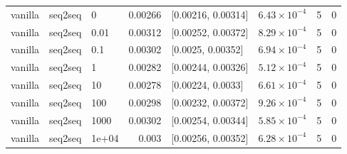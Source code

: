 \documentclass[10pt]{article}
\begin{document}
{\begin{longtable}{lllrlrrr}
vanilla & seq2seq & 0 & 0.00266 & [0.00216, 0.00314] & $6.43\times10^{-4}$ & 5 & 0\\
vanilla & seq2seq & 0.01 & 0.00312 & [0.00252, 0.00372] & $8.29\times10^{-4}$ & 5 & 0\\
vanilla & seq2seq & 0.1 & 0.00302 & [0.0025, 0.00352] & $6.94\times10^{-4}$ & 5 & 0\\
vanilla & seq2seq & 1 & 0.00282 & [0.00244, 0.00326] & $5.12\times10^{-4}$ & 5 & 0\\
vanilla & seq2seq & 10 & 0.00278 & [0.00224, 0.0033] & $6.61\times10^{-4}$ & 5 & 0\\
vanilla & seq2seq & 100 & 0.00298 & [0.00232, 0.00372] & $9.26\times10^{-4}$ & 5 & 0\\
vanilla & seq2seq & 1000 & 0.00302 & [0.00254, 0.00344] & $5.85\times10^{-4}$ & 5 & 0\\
vanilla & seq2seq & 1e+04 & 0.003 & [0.00256, 0.00352] & $6.28\times10^{-4}$ & 5 & 0\\
\bottomrule
\end{longtable}
}
\end{document}
